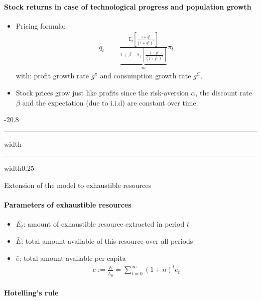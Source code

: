 \documentclass[a4paper,landscape,7pt,fleqn]{scrartcl}
\makeatletter
\renewcommand{\subsection}{\@startsection{subsection}{1}{0mm}%
{-2\baselineskip}{0.8\baselineskip}%
{\hrule depth 0.2pt width\columnwidth\hrule depth0.75pt
width0.25\columnwidth\vspace*{1.2em}\large\bfseries}}
\makeatother
\begin{document}
\begin{multicols*}{3}
\paragraph{Stock returns in case of technological progress and population growth}

\begin{itemize}
\item Pricing formula:
\begin{align*}
q_t &= \underbrace{ \frac{\mathbb{E}_t \left[ \frac{1+g^\pi}{(1+g^C)^\alpha} \right]}{1+\beta-\mathbb{E}_t \left[ \frac{1+g^\pi}{(1+g^C)^\alpha} \right]}}\limits_{m} \pi_t
\end{align*}
with: profit growth rate $g^\pi$ and consumption growth rate $g^C$.
\item Stock prices grow just like profits since the risk-aversion $\alpha$, the discount rate $\beta$ and the expectation (due to i.i.d) are constant over time.
\end{itemize}

\subsection{Extension of the model to exhaustible resources}

\paragraph{Parameters of exhaustible resources}

\begin{itemize}
\item $E_t$: amount of exhaustible resource extracted in period $t$
\item $\bar E$: total amount available of this resource over all periods
\item $\bar e$: total amount available per capita
\begin{align*}
\bar e := \frac{\bar E}{\bar L_0} = \sum_{t=0}^\infty (1+n)^t e_t
\end{align*}
\end{itemize}

\paragraph{Hotelling's rule}


\end{multicols*}
\end{document}
